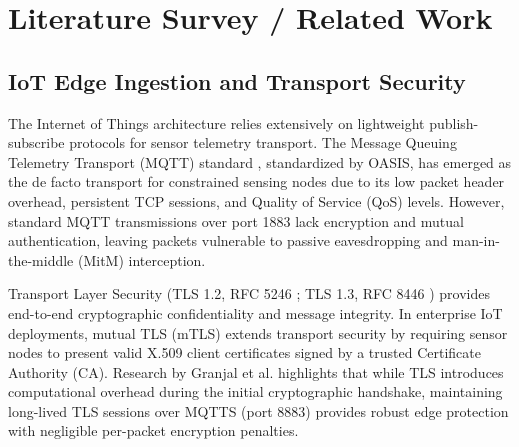 \section{Literature Survey / Related Work}

\subsection{IoT Edge Ingestion and Transport Security}
The Internet of Things architecture relies extensively on lightweight publish-subscribe protocols for sensor telemetry transport. The Message Queuing Telemetry Transport (MQTT) standard \cite{oasis_mqtt5}, standardized by OASIS, has emerged as the de facto transport for constrained sensing nodes due to its low packet header overhead, persistent TCP sessions, and Quality of Service (QoS) levels. However, standard MQTT transmissions over port 1883 lack encryption and mutual authentication, leaving packets vulnerable to passive eavesdropping and man-in-the-middle (MitM) interception.

Transport Layer Security (TLS 1.2, RFC 5246 \cite{rfc5246_tls}; TLS 1.3, RFC 8446 \cite{rfc8446_tls}) provides end-to-end cryptographic confidentiality and message integrity. In enterprise IoT deployments, mutual TLS (mTLS) extends transport security by requiring sensor nodes to present valid X.509 client certificates signed by a trusted Certificate Authority (CA). Research by Granjal et al. \cite{granjal2015security} highlights that while TLS introduces computational overhead during the initial cryptographic handshake, maintaining long-lived TLS sessions over MQTTS (port 8883) provides robust edge protection with negligible per-packet encryption penalties.

